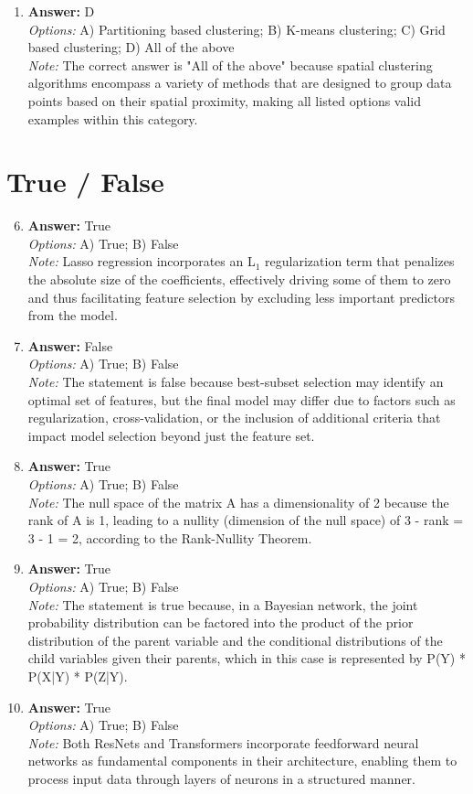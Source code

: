 \documentclass[12pt]{article}
\begin{document}
\begin{enumerate}[label=\arabic*.]
\item \textbf{Answer:} D
\\ \textit{Options:} A) Partitioning based clustering; B) K-means clustering; C) Grid based clustering; D) All of the above
\\ \textit{Note:} The correct answer is "All of the above" because spatial clustering algorithms encompass a variety of methods that are designed to group data points based on their spatial proximity, making all listed options valid examples within this category.
\end{enumerate}

\section*{True / False}
\begin{enumerate}[label=\arabic*.]
\setcounter{enumi}{5}
\item \textbf{Answer:} True
\\ \textit{Options:} A) True; B) False
\\ \textit{Note:} Lasso regression incorporates an L$_{1}$ regularization term that penalizes the absolute size of the coefficients, effectively driving some of them to zero and thus facilitating feature selection by excluding less important predictors from the model.
\item \textbf{Answer:} False
\\ \textit{Options:} A) True; B) False
\\ \textit{Note:} The statement is false because best-subset selection may identify an optimal set of features, but the final model may differ due to factors such as regularization, cross-validation, or the inclusion of additional criteria that impact model selection beyond just the feature set.
\item \textbf{Answer:} True
\\ \textit{Options:} A) True; B) False
\\ \textit{Note:} The null space of the matrix A has a dimensionality of 2 because the rank of A is 1, leading to a nullity (dimension of the null space) of 3 - rank = 3 - 1 = 2, according to the Rank-Nullity Theorem.
\item \textbf{Answer:} True
\\ \textit{Options:} A) True; B) False
\\ \textit{Note:} The statement is true because, in a Bayesian network, the joint probability distribution can be factored into the product of the prior distribution of the parent variable and the conditional distributions of the child variables given their parents, which in this case is represented by P(Y) * P(X|Y) * P(Z|Y).
\item \textbf{Answer:} True
\\ \textit{Options:} A) True; B) False
\\ \textit{Note:} Both ResNets and Transformers incorporate feedforward neural networks as fundamental components in their architecture, enabling them to process input data through layers of neurons in a structured manner.
\end{enumerate}
\end{document}
